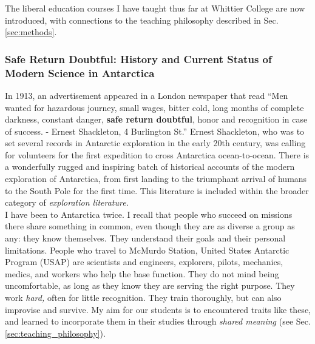 \documentclass[../../../main.tex]{subfiles}
\begin{document}
The liberal education courses I have taught thus far at Whittier College are now introduced, with connections to the teaching philosophy described in Sec. \ref{sec:methods}.

\subsubsection{Safe Return Doubtful: History and Current Status of Modern Science in Antarctica}

In 1913, an advertisement appeared in a London newspaper that read ``Men wanted for hazardous journey, small wages, bitter cold, long months of complete darkness, constant danger, \textbf{safe return doubtful}, honor and recognition in case of success. - Ernest Shackleton, 4 Burlington St.''  Ernest Shackleton, who was to set several records in Antarctic exploration in the early 20th century, was calling for volunteers for the first expedition to cross Antarctica ocean-to-ocean.  There is a wonderfully rugged and inspiring batch of historical accounts of the modern exploration of Antarctica, from first landing to the triumphant arrival of humans to the South Pole for the first time.  This literature is included within the broader category of \textit{exploration literature.}
\\
\vspace{0.25cm}
I have been to Antarctica twice.  I recall that people who succeed on missions there share something in common, even though they are as diverse a group as any: they know themselves.  They understand their goals and their personal limitations.  People who travel to McMurdo Station, United States Antarctic Program (USAP) are scientists and engineers, explorers, pilots, mechanics, medics, and workers who help the base function.  They do not mind being uncomfortable, as long as they know they are serving the right purpose.  They work \textit{hard,} often for little recognition.  They train thoroughly, but can also improvise and survive.  My aim for our students is to encountered traits like these, and learned to incorporate them in their studies through \textit{shared meaning} (see Sec. \ref{sec:teaching_philosophy}).
\\
\vspace{0.25cm}
\end{document}
